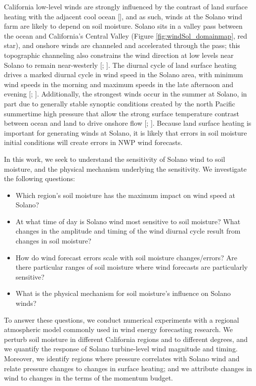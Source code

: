 California low-level winds are strongly influenced by the contrast of land surface heating with the adjacent cool ocean [\cite{zhong2004diurnal}], and as such, winds at the Solano wind farm are likely to depend on soil moisture.  Solano sits in a valley pass between the ocean and California's Central Valley (Figure \ref{fig:windSol_domainmap}, red star), and onshore winds are channeled and accelerated through the pass; this topographic channeling also constrains the wind direction at low levels near Solano to remain near-westerly [\cite{zhong2004diurnal}; \cite{mansbach2010synoptic}].  The diurnal cycle of land surface heating drives a marked diurnal cycle in wind speed in the Solano area, with minimum wind speeds in the morning and maximum speeds in the late afternoon and evening [\cite{zhong2004diurnal}; \cite{mansbach2010synoptic}].  Additionally, the strongest winds occur in the summer at Solano, in part due to generally stable synoptic conditions created by the north Pacific summertime high pressure that allow the strong surface temperature contrast between ocean and land to drive onshore flow [\cite{zhong2004diurnal}; \cite{mansbach2010synoptic}]. Because land surface heating is important for generating winds at Solano, it is likely that errors in soil moisture initial conditions will create errors in NWP wind forecasts.

In this work, we seek to understand the sensitivity of Solano wind to soil moisture, and the physical mechanism underlying the sensitivity.  We investigate the following questions:
\begin{itemize}
\item Which region's soil moisture has the maximum impact on wind speed at Solano?
\item At what time of day is Solano wind most sensitive to soil moisture?  What changes in the amplitude and timing of the wind diurnal cycle result from changes in soil moisture?
\item How do wind forecast errors scale with soil moisture changes/errors?  Are there particular ranges of soil moisture where wind forecasts are particularly sensitive?
\item What is the physical mechanism for soil moisture's influence on Solano winds?
\end{itemize}

To answer these questions, we conduct numerical experiments with a regional atmospheric model commonly used in wind energy forecasting research.  We perturb soil moisture in different California regions and to different degrees, and we quantify the response of Solano turbine-level wind magnitude and timing.  Moreover, we identify regions where pressure correlates with Solano wind and relate pressure changes to changes in surface heating; and we attribute changes in wind to changes in the terms of the momentum budget.

